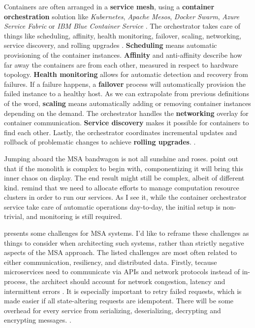 \documentclass[utf8,english]{gradu3}
\begin{document}
Containers are often arranged in a \textbf{service mesh}, using a
\textbf{container orchestration} solution like \textit{Kubernetes},
\textit{Apache Mesos}, \textit{Docker Swarm}, \textit{Azure Service Fabric} or
\textit{IBM Blue Container Service} \parencite[18]{Gannon2017}. The orchestrator
takes care of things like scheduling, affinity, health monitoring, failover,
scaling, networking, service discovery, and rolling upgrades
\parencite{Microsoft2022-CNA}. \textbf{Scheduling} means automatic provisioning of
the container instances. \textbf{Affinity} and anti-affinity describe how far
away the containers are from each other, measured in respect to hardware
topology. \textbf{Health monitoring} allows for automatic detection and recovery
from failures. If a failure happens, a \textbf{failover} process will
automatically provision the failed instance to a healthy host. As we can
extrapolate from previous definitions of the word, \textbf{scaling} means
automatically adding or removing container instances depending on the demand.
The orchestrator handles the \textbf{networking} overlay for container
communication. \textbf{Service discovery} makes it possible for containers to
find each other. Lastly, the orchestrator coordinates incremental updates and
rollback of problematic changes to achieve \textbf{rolling upgrades}.
\parencite{Microsoft2022-CNA}.

Jumping aboard the MSA bandwagon is not all sunshine and roses.
\textcite[18]{Li2021} point out that if the monolith is complex to begin with,
componentizing it will bring this inner chaos on display. The end result might
still be complex, albeit of different kind. \textcite[20]{Gannon2017} remind
that we need to allocate efforts to manage computation resource clusters in
order to run our services. As I see it, while the container orchestrator service
take care of automatic operations day-to-day, the initial setup is non-trivial,
and monitoring is still required.

\textcite{Microsoft2022-CNA} presents some challenges for MSA systems.  I'd like
to reframe these challenges as things to consider when architecting such
systems, rather than strictly negative aspects of the MSA approach. The listed
challenges are most often related to either communication, resiliency, and
distributed data. Firstly, tecause microservices need to communicate via APIs and network
protocols instead of in-process, the architect should account for network
congestion, latency and intermittent errors
\parencite{Microsoft2022-Communication}. It is especially important to retry
failed requests, which is made easier if all state-altering requests are
idempotent. There will be some overhead for every service from serializing,
deserializing, decrypting and encrypting messages.
\parencite{Microsoft2022-Communication}.
\end{document}
